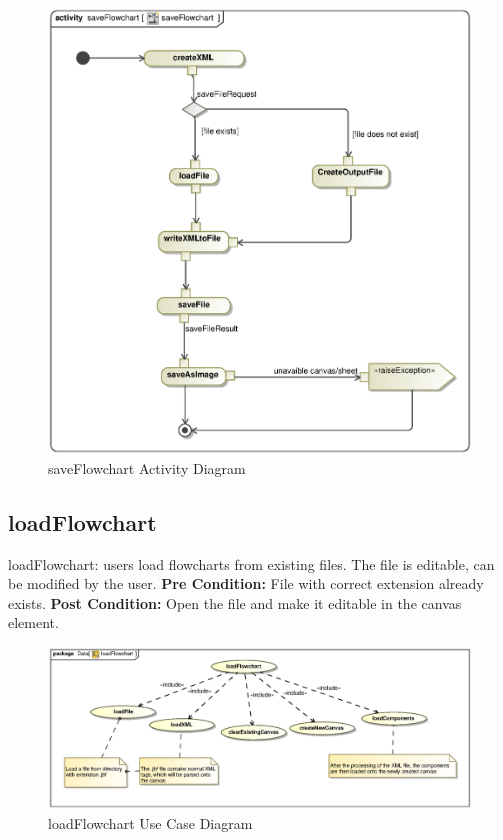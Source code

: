 \documentclass[11pt,a4paper,titlepage]{article}
\begin{document}
\begin{figure}[H]
  \centering
\includegraphics[width=500px]{saveFlowchart.eps}
\caption{saveFlowchart Activity Diagram}
\end{figure}

\newpage
\subsection{loadFlowchart}
loadFlowchart: users load flowcharts from existing files. The file is editable, can be modified by the user.\newline\newline
\textbf{Pre Condition:} File with correct extension already exists.\newline\newline
\textbf{Post Condition:} Open the file and make it editable in the canvas element.

\begin{figure}[H]
  \centering
\includegraphics[width=500px]{loadFlowchart.eps}
\caption{loadFlowchart Use Case Diagram}
\end{figure}
\end{document}
